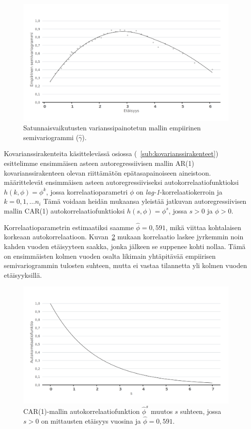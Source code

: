 \documentclass[finnish]{docopts}
\begin{document}
\begin{figure}[H]
\centering
  \includegraphics[scale=0.8]{kuvaajat/lme2_v_vario.png}
  \caption{Satunnaisvaikutusten varianssipainotetun mallin empiirinen semivariogrammi ($\hat{\gamma}$).}
  \label{fig:lme2_v_vario}
\end{figure}

Kovarianssirakenteita käsittelevässä osiossa (~\ref{sub:kovarianssirakenteet}) esittelimme ensimmäisen asteen autoregressiivisen mallin AR(1) kovarianssirakenteen olevan riittämätön epätasapainoiseen aineistoon. \cite{pinheiro00} määrittelevät ensimmäisen asteen autoregressiiviseksi autokorrelaatiofunktioksi $h(k,\phi)=\phi^k$, jossa korrelaatioparametri $\phi$ on \textit{lag-1}-korrelaatiokerroin ja $k=0,1,\dots n_i$ Tämä voidaan heidän mukaansa yleistää jatkuvan autoregressiivisen mallin CAR(1) autokorrelaatiofunktioksi $h(s,\phi)=\phi^s$, jossa $s>0$ ja $\phi>0$.

Korrelaatioparametrin estimaatiksi saamme $\hat{\phi} = 0,591$, mikä viittaa kohtalaisen korkeaan autokorrelaatioon. Kuvan~\ref{fig:lme2_corfunc} mukaan korrelaatio laskee jyrkemmin noin kahden vuoden etäisyyteen saakka, jonka jälkeen se suppenee kohti nollaa. Tämä on ensimmäisten kolmen vuoden osalta likimain yhtäpitävää empiirisen semivariogrammin tulosten suhteen, mutta ei vastaa tilannetta yli kolmen vuoden etäisyyksillä.\\

\begin{figure}[H]
\centering
  \includegraphics[scale=0.8]{kuvaajat/lme2_corfunc.png}
  \caption{CAR(1)-mallin autokorrelaatiofunktion $\hat{\phi}^s$ muutos $s$ suhteen, jossa $s>0$ on mittausten etäisyys vuosina ja $\hat{\phi} = 0,591$.}
  \label{fig:lme2_corfunc}
\end{figure}
\end{document}
